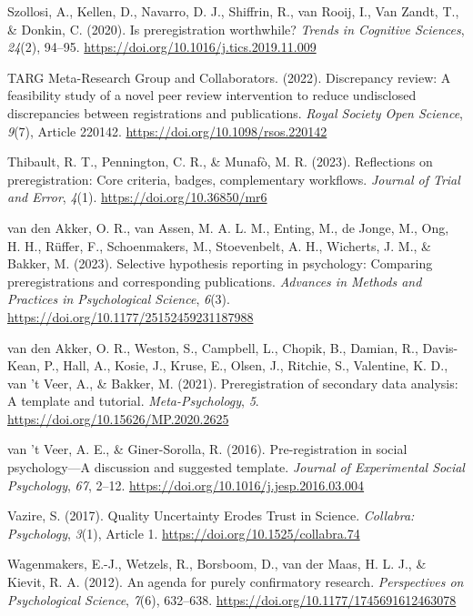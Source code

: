 \documentclass[authordate, meta]{jote-new-article}
\begin{document}
	Szollosi, A., Kellen, D., Navarro, D. J., Shiffrin, R., van Rooij, I., Van Zandt, T., \& Donkin, C. (2020). Is preregistration worthwhile? \emph{Trends in Cognitive Sciences}, \emph{24}(2), 94--95. \url{https://doi.org/10.1016/j.tics.2019.11.009}



	TARG Meta-Research Group and Collaborators. (2022). Discrepancy review: A feasibility study of a novel peer review intervention to reduce undisclosed discrepancies between registrations and publications. \emph{Royal Society Open Science}, \emph{9}(7), Article 220142. \url{https://doi.org/10.1098/rsos.220142}



	Thibault, R. T., Pennington, C. R., \& Munafò, M. R. (2023). Reflections on preregistration: Core criteria, badges, complementary workflows. \emph{Journal of Trial and Error}, \emph{4}(1). \url{https://doi.org/10.36850/mr6}



	van den Akker, O. R., van Assen, M. A. L. M., Enting, M., de Jonge, M., Ong, H. H., Rüffer, F., Schoenmakers, M., Stoevenbelt, A. H., Wicherts, J. M., \& Bakker, M. (2023). Selective hypothesis reporting in psychology: Comparing preregistrations and corresponding publications. \emph{Advances in Methods and Practices in Psychological Science}, \emph{6}(3). \url{https://doi.org/10.1177/25152459231187988}



	van den Akker, O. R., Weston, S., Campbell, L., Chopik, B., Damian, R., Davis-Kean, P., Hall, A., Kosie, J., Kruse, E., Olsen, J., Ritchie, S., Valentine, K. D., van 't Veer, A., \& Bakker, M. (2021). Preregistration of secondary data analysis: A template and tutorial. \emph{Meta-Psychology}, \emph{5}. \url{https://doi.org/10.15626/MP.2020.2625}



	van 't Veer, A. E., \& Giner-Sorolla, R. (2016). Pre-registration in social psychology—A discussion and suggested template. \emph{Journal of Experimental Social Psychology}, \emph{67}, 2--12. \url{https://doi.org/10.1016/j.jesp.2016.03.004}



	Vazire, S. (2017). Quality Uncertainty Erodes Trust in Science. \emph{Collabra: Psychology}, \emph{3}(1), Article 1. \url{https://doi.org/10.1525/collabra.74}



	Wagenmakers, E.-J., Wetzels, R., Borsboom, D., van der Maas, H. L. J., \& Kievit, R. A. (2012). An agenda for purely confirmatory research. \emph{Perspectives on Psychological Science}, \emph{7}(6), 632--638. \url{https://doi.org/10.1177/1745691612463078}
\end{document}
